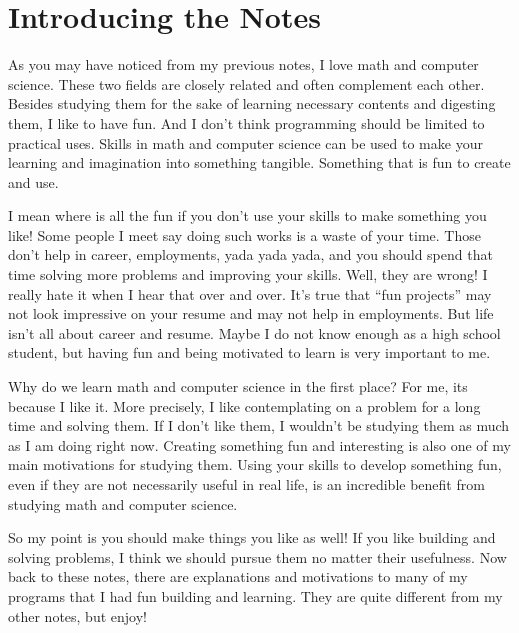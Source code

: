 \documentclass[../../../main.tex]{subfiles}
\begin{document}
\chapter*{Introducing the Notes}

As you may have noticed from my previous notes, I love math and
computer science. These two fields are closely related and often
complement each other. Besides studying them for the sake of
learning necessary contents and digesting them, I like to have fun.
And I don't think programming should be limited to practical uses.
Skills in math and computer science can be used to make your learning
and imagination into something tangible. Something that is fun to
create and use.

I mean where is all the fun if you don't use your skills to make
something you like! Some people I meet say doing such works is a
waste of your time. Those don't help in career, employments,
yada yada yada, and you should spend that time solving more problems
and improving your skills. Well, they are wrong! I really hate it
when I hear that over and over. It's true that ``fun projects'' may
not look impressive on your resume and may not help in employments.
But life isn't all about career and resume. Maybe I do not know
enough as a high school student, but having fun and being motivated
to learn is very important to me.

Why do we learn math and computer science in the first place?
For me, its because I like it. More precisely, I like contemplating on
a problem for a long time and solving them. If I don't like them,
I wouldn't be studying them as much as I am doing right now.
Creating something fun and interesting is also one of my main
motivations for studying them. Using your skills to develop something
fun, even if they are not necessarily useful in real life, is an
incredible benefit from studying math and computer science.

So my point is you should make things you like as well! If you like
building and solving problems, I think we should pursue them no matter
their usefulness. Now back to these notes, there are explanations and
motivations to many of my programs that I had fun building and
learning. They are quite different from my other notes, but enjoy!
\end{document}
